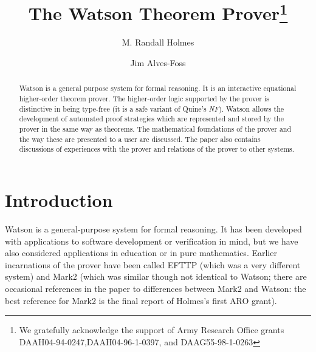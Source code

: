\documentclass{kluwer}
\begin{document}
\begin{article}

\begin{opening}

\title{The Watson Theorem Prover\footnote{We gratefully acknowledge
the support of Army Research Office grants DAAH04-94-0247,DAAH04-96-1-0397, 
and DAAG55-98-1-0263}}

\author{M. Randall Holmes}


\author{Jim Alves-Foss}




\begin{abstract}
Watson is a general purpose system for formal reasoning.  It is an
interactive equational higher-order theorem prover.  The higher-order
logic supported by the prover is distinctive in being type-free (it is
a safe variant of Quine's {\em NF\/}).  Watson allows the development
of automated proof strategies which are represented and stored by the
prover in the same way as theorems.  The mathematical foundations of
the prover and the way these are presented to a user are discussed.
The paper also contains discussions of experiences with the prover and
relations of the prover to other systems.
\end{abstract}



\end{opening}



\section{Introduction}

Watson is a general-purpose system for formal reasoning.  It has been
developed with applications to software development or verification in
mind, but we have also considered applications in education or in pure
mathematics.  Earlier incarnations of the prover have been called
EFTTP (which was a very different system) and Mark2 (which was similar
though not identical to Watson; there are occasional references in the
paper to differences between Mark2 and Watson: the best reference
for Mark2 is the final report \cite{finalreport} of Holmes's first ARO
grant).


\end{article}
\end{document}
